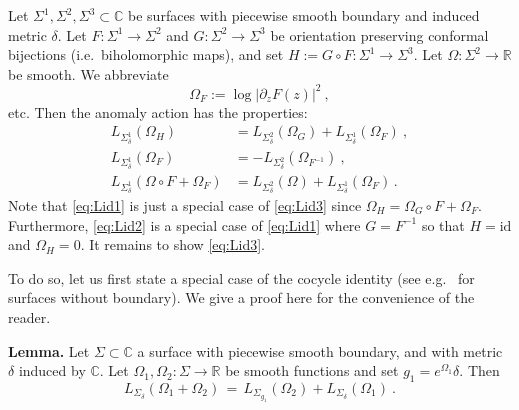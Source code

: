 \documentclass[11pt,a4paper]{article}
\numberwithin{equation}{section}
\begin{document}
Let $\Sigma^1, \Sigma^2, \Sigma^3 \subset \mathbb{C}$ be surfaces with piecewise smooth boundary and induced metric $\delta$. Let $F : \Sigma^1 \to \Sigma^2$ and $G : \Sigma^2 \to \Sigma^3$ be orientation preserving conformal bijections (i.e.\ biholomorphic maps), and set $H := G \circ F : \Sigma^1 \to \Sigma^3$. Let $\Omega:\Sigma^2 \to \mathbb{R}$ be smooth. We abbreviate 
\begin{equation}
    \Omega_F := \log|\partial_z F(z)|^2 \ ,
\end{equation}
etc. Then the anomaly action has the properties: 
\begin{subequations}
\begin{align}
    L_{\Sigma^1_\delta}(\Omega_{H}) &= L_{\Sigma^2_\delta}(\Omega_G) + L_{\Sigma^1_\delta}(\Omega_F)\ ,
    \label{eq:Lid1}
    \\    
    L_{\Sigma^1_\delta}(\Omega_F) &= - L_{\Sigma^2_\delta}(\Omega_{F^{-1}}) \ ,
    \label{eq:Lid2}
    \\    
    L_{\Sigma^1_\delta}(\Omega\circ F+\Omega_F) &= L_{\Sigma^2_\delta}(\Omega) + L_{\Sigma^1_\delta}(\Omega_F)\,.
    \label{eq:Lid3}
\end{align}
\end{subequations}
Note that \eqref{eq:Lid1} is just a special case of \eqref{eq:Lid3} since $\Omega_H = \Omega_G \circ F + \Omega_F$. 
Furthermore, \eqref{eq:Lid2} is a special case of \eqref{eq:Lid1} where $G = F^{-1}$ so that $H=\mathrm{id}$ and $\Omega_H=0$.
It remains to show \eqref{eq:Lid3}. 

To do so, let us first state a special case of the cocycle identity (see e.g.\ \cite[Lem.\,2.1]{Kontsevich:2006} for surfaces without boundary). We give a proof here for the convenience of the reader.

\smallskip
\noindent
\textbf{Lemma.} 
Let $\Sigma \subset \mathbb{C}$ a surface with piecewise smooth boundary, and with metric $\delta$ induced by $\mathbb{C}$. Let $\Omega_1,\Omega_2:\Sigma \to \mathbb{R}$ be smooth functions and set $g_1 = e^{\Omega_1} \delta$. Then
\begin{equation}\label{eq:LO1+O2}
    L_{\Sigma_\delta}(\Omega_1 + \Omega_2) \,=\, L_{\Sigma_{g_1}}(\Omega_2) + L_{\Sigma_\delta}(\Omega_1) \ .
\end{equation}
\end{document}
